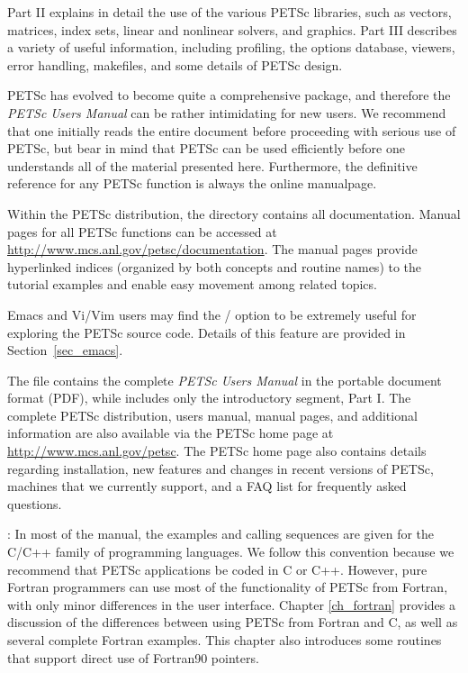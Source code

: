 Part II explains in detail the use of the various PETSc libraries,
such as vectors, matrices, index sets, linear and nonlinear
solvers, and graphics.  Part III describes a variety of useful
information, including profiling, the options database, viewers, error
handling, makefiles, and some details of
PETSc design.

\nocite{efficient}

PETSc has evolved to become quite a comprehensive package, and therefore the
{\em PETSc Users Manual} can be rather intimidating for new users. We
recommend that one initially reads the entire document before proceeding with
serious use of PETSc, but bear in mind that PETSc can be used efficiently
before one understands all of the material presented here. Furthermore, the
definitive reference for any PETSc function is always the online manualpage.

\medskip \medskip

Within the PETSc distribution, the directory 
contains all documentation.
Manual pages for all PETSc functions can be
accessed at \href{http://www.mcs.anl.gov/petsc/documentation}{http://www.mcs.anl.gov/petsc/documentation}.
The manual pages
provide hyperlinked indices (organized by
both concepts and routine names) to the tutorial examples and enable
easy movement among related topics.

Emacs and Vi/Vim users may find the
/  option to be extremely useful for exploring the PETSc
source code.  Details of this feature are provided in
Section~\ref{sec_emacs}.

The file  contains
the complete {\em PETSc Users Manual} in the portable document format (PDF),
while 
includes only the introductory segment, Part I.  
The complete PETSc distribution, users
manual, manual pages, and additional information are also available via
the PETSc home page at
\href{http://www.mcs.anl.gov/petsc}{http://www.mcs.anl.gov/petsc}.
The PETSc home page also
contains details regarding installation, new features and changes in recent
versions of PETSc, machines that we currently support, and a FAQ list for frequently asked questions.

\medskip\medskip

: In most of the
manual, the examples and calling sequences are given for the C/C++
family of programming languages.  We follow this convention because we
recommend that PETSc applications be coded in C or C++.
However, pure Fortran programmers can use most of the
functionality of PETSc from Fortran, with only minor differences in
the user interface.  Chapter \ref{ch_fortran} provides a discussion of the
differences between using PETSc from Fortran and C, as well as several
complete Fortran examples.  This chapter also introduces some
routines that support direct use of Fortran90 pointers.

